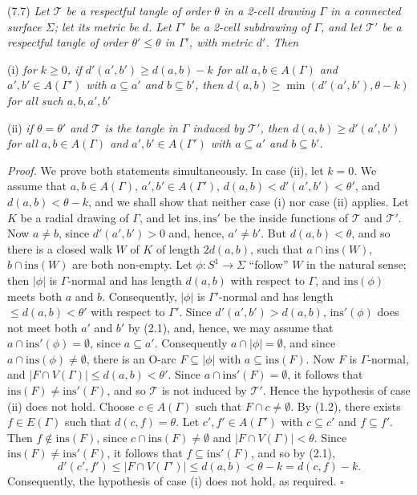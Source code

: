\stmt
(7.7) \textit{Let $\mathscr{T}$ be a respectful tangle of order $\theta$ in a 2-cell drawing $\Gamma$ in a connected surface $\Sigma$; let its metric be $d$. Let $\Gamma'$ be a 2-cell subdrawing of $\Gamma$, and let $\mathscr{T}'$ be a respectful tangle of order $\theta' \le \theta$ in $\Gamma'$, with metric $d'$. Then}

\hspace*{12pt}(i) \textit{for $k \ge 0$, if $d'(a', b') \ge d(a, b) - k$ for all $a, b \in A(\Gamma)$ and $a', b' \in A(\Gamma')$ with $a \subseteq a'$ and $b \subseteq b'$, then $d(a, b) \ge \min(d'(a', b'), \theta - k)$ for all such $a, b, a', b'$}

\hspace*{12pt}(ii) \textit{if $\theta = \theta'$ and $\mathscr{T}$ is the tangle in $\Gamma$ induced by $\mathscr{T}'$, then $d(a, b) \ge d'(a', b')$ for all $a, b \in A(\Gamma)$ and $a', b' \in A(\Gamma')$ with $a \subseteq a'$ and $b \subseteq b'$.}

\textit{Proof.} We prove both statements simultaneously. In case (ii), let $k = 0$. We assume that $a, b \in A(\Gamma)$, $a', b' \in A(\Gamma')$, $d(a, b) < d'(a', b') < \theta'$, and $d(a, b) < \theta - k$, and we shall show that neither case (i) nor case (ii) applies. Let $K$ be a radial drawing of $\Gamma$, and let $\text{ins}, \text{ins}'$ be the inside functions of $\mathscr{T}$ and $\mathscr{T}'$. Now $a \ne b$, since $d'(a', b') > 0$ and, hence, $a' \ne b'$. But $d(a, b) < \theta$, and so there is a closed walk $W$ of $K$ of length $2d(a, b)$, such that $a \cap \text{ins}(W)$, $b \cap \text{ins}(W)$ are both non-empty. Let $\phi \colon S^1 \to \Sigma$ ``follow'' $W$ in the natural sense; then $|\phi|$ is $\Gamma$-normal and has length $d(a, b)$ with respect to $\Gamma$, and $\text{ins}(\phi)$ meets both $a$ and $b$. Consequently, $|\phi|$ is $\Gamma'$-normal and has length $\le d(a, b) < \theta'$ with respect to $\Gamma'$. Since $d'(a', b') > d(a, b)$, $\text{ins}'(\phi)$ does not meet both $a'$ and $b'$ by (2.1), and, hence, we may assume that $a \cap \text{ins}'(\phi) = \emptyset$, since $a \subseteq a'$. Consequently $a \cap |\phi| = \emptyset$, and since $a \cap \text{ins}(\phi) \ne \emptyset$, there is an O-arc $F \subseteq |\phi|$ with $a \subseteq \text{ins}(F)$. Now $F$ is $\Gamma$-normal, and $|F \cap V(\Gamma)| \le d(a, b) < \theta'$. Since $a \cap \text{ins}'(F) = \emptyset$, it follows that $\text{ins}(F) \ne \text{ins}'(F)$, and so $\mathscr{T}$ is not induced by $\mathscr{T}'$. Hence the hypothesis of case (ii) does not hold. Choose $c \in A(\Gamma)$ such that $F \cap c \ne \emptyset$. By (1.2), there exists $f \in E(\Gamma)$ such that $d(c, f) = \theta$. Let $c', f' \in A(\Gamma')$ with $c \subseteq c'$ and $f \subseteq f'$. Then $f \notin \text{ins}(F)$, since $c \cap \text{ins}(F) \ne \emptyset$ and $|F \cap V(\Gamma)| < \theta$. Since $\text{ins}(F) \ne \text{ins}'(F)$, it follows that $f \subseteq \text{ins}'(F)$, and so by (2.1),
\begin{equation*}
d'(c', f') \le |F \cap V(\Gamma')| \le d(a, b) < \theta - k = d(c, f) - k.
\end{equation*}
Consequently, the hypothesis of case (i) does not hold, as required. $\square$

